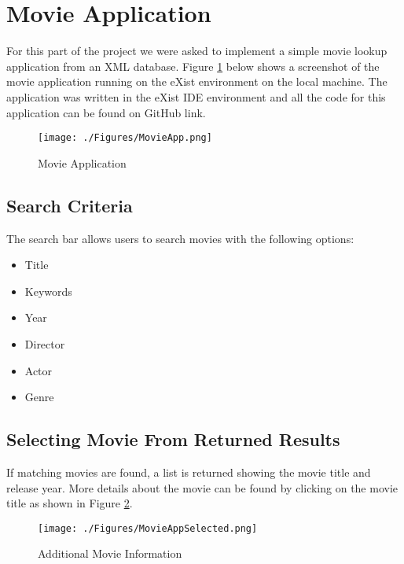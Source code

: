 \documentclass[MoviesApp.tex]{subfiles}
\begin{document}
\section{Movie Application}

For this part of the project we were asked to implement a simple movie lookup application from an XML database. Figure \ref{fig:movieapp} below shows a screenshot of the movie application running on the eXist environment on the local machine. The application was written in the eXist IDE environment and all the code for this application can be found on GitHub link.

\begin{figure}[H]
	\centering
	\texttt{[image: ./Figures/MovieApp.png]}
	\caption{Movie Application}
	\label{fig:movieapp}
\end{figure}

\subsection{Search Criteria}
The search bar allows users to search movies with the following options:

\begin{itemize}
\item Title
\item Keywords
\item Year
\item Director
\item Actor
\item Genre
\end{itemize}

\subsection{Selecting Movie From Returned Results}
If matching movies are found, a list is returned showing the movie title and release year. More details about the movie can be found by clicking on the movie title as shown in Figure \ref{fig:movieappselected}.

\begin{figure} [H]
	\centering
	\texttt{[image: ./Figures/MovieAppSelected.png]}
	\caption{Additional Movie Information}
	\label{fig:movieappselected}
\end{figure}
\end{document}
